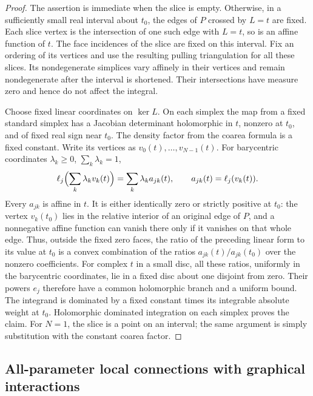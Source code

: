 \documentclass[11pt,a4paper]{article}
\theoremstyle{definition}
\theoremstyle{remark}
\numberwithin{equation}{section}
\begin{document}
\begin{proof}
The assertion is immediate when the slice is empty. Otherwise,
in a sufficiently small real interval about $t_0$, the edges of $P$
crossed by $L=t$ are fixed. Each slice vertex is the intersection of
one such edge with $L=t$, so is an affine function of $t$. The face
incidences of the slice are fixed on this interval. Fix an ordering
of its vertices and use the resulting pulling triangulation for all
these slices. Its nondegenerate simplices vary affinely in their
vertices and remain nondegenerate after the interval is shortened.
Their intersections have measure zero and hence do not affect the
integral.

Choose fixed linear coordinates on $\ker L$. On each simplex the
map from a fixed standard simplex has a Jacobian determinant
holomorphic in $t$, nonzero at $t_0$, and of fixed real sign near
$t_0$. The density factor from the coarea formula is a fixed
constant. Write its vertices as $v_0(t),\ldots,v_{N-1}(t)$. For
barycentric coordinates $\lambda_k\geq0$, $\sum_k\lambda_k=1$,
\[
 \ell_j\Bigl(\sum_k\lambda_kv_k(t)\Bigr)
     =\sum_k\lambda_k a_{jk}(t),\qquad
 a_{jk}(t)=\ell_j(v_k(t)).
\]
Every $a_{jk}$ is affine in $t$. It is either identically zero or
strictly positive at $t_0$: the vertex $v_k(t_0)$ lies in the relative
interior of an original edge of $P$, and a nonnegative affine
function can vanish there only if it vanishes on that whole edge.
Thus, outside the fixed zero faces, the ratio of the preceding
linear form to its value at $t_0$ is a convex combination of the
ratios $a_{jk}(t)/a_{jk}(t_0)$ over the nonzero coefficients.
For complex $t$ in a small disc, all these ratios, uniformly in the
barycentric coordinates, lie in a fixed disc about one disjoint
from zero. Their powers $e_j$ therefore have a common holomorphic
branch and a uniform bound. The integrand is dominated by a fixed
constant times its integrable absolute weight at $t_0$.
Holomorphic dominated integration on each simplex proves the
claim. For $N=1$, the slice is a point on an interval; the same
argument is simply substitution with the constant coarea factor.
\end{proof}

\subsection{All-parameter local connections with graphical interactions}
\end{document}
